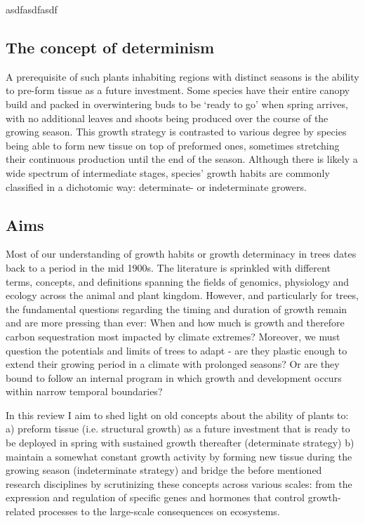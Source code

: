 \documentclass{article}
\begin{document}
	 \citep{borchertClimaticPeriodicityPhenology1999, borchertComputeraidedEvaluationShootgrowth1976}
	\citet{boojhGrowthStrategyTrees1982}  
	\citep{borchertClimaticPeriodicityPhenology1999}
	\citep{rossiPatternXylemPhenology2016a}
	\cite{} 
	asdfasdfasdf
	\subsection*{The concept of determinism}
	A prerequisite of such plants inhabiting regions with distinct seasons is the ability to pre-form tissue as a future investment. Some species have their entire canopy build and packed in overwintering buds to be ‘ready to go’ when spring arrives, with no additional leaves and shoots being produced over the course of the growing season. This growth strategy is contrasted to various degree by species being able to form new tissue on top of preformed ones, sometimes stretching their continuous production until the end of the season. Although there is likely a wide spectrum of intermediate stages, species’ growth habits are commonly classified in a dichotomic way: determinate- or indeterminate growers.
	
	\subsection*{Aims}
	Most of our understanding of growth habits or growth determinacy in trees dates back to a period in the mid 1900s. The literature is sprinkled with different terms, concepts, and definitions spanning the fields of genomics, physiology and ecology across the animal and plant kingdom. However, and particularly for trees, the fundamental questions regarding the timing and duration of growth remain and are more pressing than ever: When and how much is growth and therefore carbon sequestration most impacted by climate extremes? Moreover, we must question the potentials and limits of trees to adapt - are they plastic enough to extend their growing period in a climate with prolonged seasons? Or are they bound to follow an internal program in which growth and development occurs within narrow temporal boundaries?
	
	In this review I aim to shed light on old concepts about the ability of plants to:
	a) preform tissue (i.e. structural growth) as a future investment that is ready to be deployed in spring with sustained growth thereafter (determinate strategy)
	b) maintain a somewhat constant growth activity by forming new tissue during the growing season (indeterminate strategy)
	and bridge the before mentioned research disciplines by scrutinizing these concepts across various scales: from the expression and regulation of specific genes and hormones that control growth-related processes to the large-scale consequences on ecosystems. 
	\\
\end{document}
